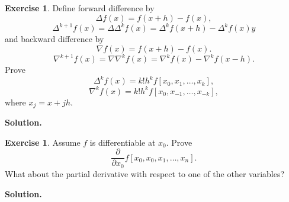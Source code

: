 \message{ !name(hw2-21935004-\unexpanded{谭焱}.tex)}\documentclass[a4paper]{book}
\newenvironment{solution}%
{\noindent\textbf{Solution.}}%
{\qedhere}
\numberwithin{equation}{chapter}
\theoremstyle{definition}
\newtheorem{exc}[exm]{Exercise}
\begin{document}
\begin{exc}
  Define forward difference by
  \[ \Delta f(x) = f(x + h) - f(x), \]
  \[ \Delta^{k+1}f(x) = \Delta \Delta^{k}f(x) = \Delta^{k}f(x+h) - \Delta^{k}f(x)y\]
  and backward difference by
  \[ \nabla f(x) = f(x + h) - f(x). \]
  \[ \nabla^{k+1}f(x) = \nabla\nabla^{k}f(x) = \nabla^{k}f(x) - \nabla^{k}f(x - h). \]
  Prove
  \[ \Delta^{k}f(x) = k! h^k f[x_0,x_1,\dots, x_k], \]
  \[ \nabla^{k}f(x) = k! h^k f[x_0,x_{-1}, \dots, x_{-k}],\]
  where $x_j = x + jh$.
\end{exc}

\begin{solution}
  
\end{solution}

\begin{exc}
  Assume $f$ is differentiable at $x_0$. Prove
  \[ \frac{\partial}{\partial x_0} f[x_0, x_0, x_1, \dots, x_n].\]
  What about the partial derivative with respect to one of the other variables?
\end{exc}

\begin{solution}
  
\end{solution}




\end{document}
